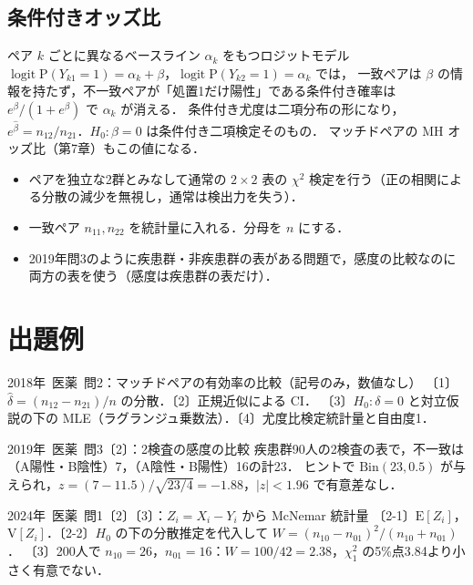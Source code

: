 \documentclass[a4paper,11pt,openany]{ltjsbook}
\newcommand{\kakomon}[2]{\mbox{#1年 医薬 問#2}}
\newcommand{\E}{\mathrm{E}}
\newcommand{\V}{\mathrm{V}}
\newcommand{\Prob}{\mathrm{P}}
\newcommand{\logit}{\operatorname{logit}}
\newcommand{\Bin}{\mathrm{Bin}}
\begin{document}
\subsection{条件付きオッズ比}
ペア $k$ ごとに異なるベースライン $\alpha_k$ をもつロジットモデル $\logit\Prob(Y_{k1}=1)=\alpha_k+\beta$，$\logit\Prob(Y_{k2}=1)=\alpha_k$ では，
一致ペアは $\beta$ の情報を持たず，不一致ペアが「処置1だけ陽性」である条件付き確率は $e^\beta/(1+e^\beta)$ で $\alpha_k$ が消える．
条件付き尤度は二項分布の形になり，$e^{\hat\beta}=n_{12}/n_{21}$．$H_0:\beta=0$ は条件付き二項検定そのもの．
マッチドペアの MH オッズ比（第7章）もこの値になる．

\begin{warnbox}
\begin{itemize}
\item ペアを独立な2群とみなして通常の $2\times2$ 表の $\chi^2$ 検定を行う（正の相関による分散の減少を無視し，通常は検出力を失う）．
\item 一致ペア $n_{11},n_{22}$ を統計量に入れる．分母を $n$ にする．
\item 2019年問3のように疾患群・非疾患群の表がある問題で，感度の比較なのに両方の表を使う（感度は疾患群の表だけ）．
\end{itemize}
\end{warnbox}

\section{出題例}\label{sec:m06-shutsudai}
\begin{shutsudai}{\kakomon{2018}{2}：マッチドペアの有効率の比較（記号のみ，数値なし）}
〔1〕$\hat\delta=(n_{12}-n_{21})/n$ の分散．〔2〕正規近似による CI．
〔3〕$H_0:\delta=0$ と対立仮説の下の MLE（ラグランジュ乗数法）．〔4〕尤度比検定統計量と自由度1．
\end{shutsudai}
\begin{shutsudai}{\kakomon{2019}{3}〔2〕：2検査の感度の比較}
疾患群90人の2検査の表で，不一致は（A陽性・B陰性）7，（A陰性・B陽性）16の計23．
ヒントで $\Bin(23,0.5)$ が与えられ，$z=(7-11.5)/\sqrt{23/4}=-1.88$，$|z|<1.96$ で有意差なし．
\end{shutsudai}
\begin{shutsudai}{\kakomon{2024}{1}〔2〕〔3〕：$Z_i=X_i-Y_i$ から McNemar 統計量}
〔2-1〕$\E[Z_i]$，$\V[Z_i]$．〔2-2〕$H_0$ の下の分散推定を代入して $W=(n_{10}-n_{01})^2/(n_{10}+n_{01})$．
〔3〕200人で $n_{10}=26$，$n_{01}=16$：$W=100/42=2.38$，$\chi^2_1$ の5\%点3.84より小さく有意でない．
\end{shutsudai}
\end{document}
